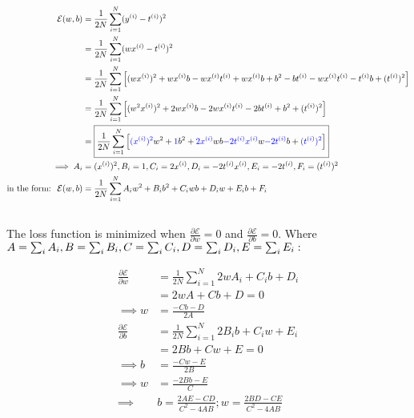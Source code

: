 \documentclass{article}
\begin{document}
\subsection{}

\begin{align*}
\mathcal{E} (w, b) &= \frac{1}{2N} \sum_{i = 1}^{N} (y^{(i)} - t^{(i)})^2 \\
&=  \frac{1}{2N} \sum_{i = 1}^{N} (wx^{(i)} - t^{(i)})^2 \\
&= \frac{1}{2N}  \sum_{i = 1}^{N}  \left[ (wx^{(i)})^2 + wx^{(i)}b -wx^{(i)} t^{(i)} + wx^{(i)}b + b^2 - bt^{(i)} - wx^{(i)}t^{(i)} - t^{(i)}b + (t^{(i)})^2 \right] \\
&= \frac{1}{2N}  \sum_{i = 1}^{N}  \left[ (w^2 x^{(i)})^2 + 2wx^{(i)} b - 2w x^{(i)} t^{(i)} - 2bt^{(i)} + b^2 + (t^{(i)})^2 \right] \\
&= \boxed{ \frac{1}{2N}  \sum_{i = 1}^{N} \left[ \textcolor{blue}{(x^{(i)})^2} w^2 + \textcolor{blue}{1}b^2 + \textcolor{blue}{2x^{(i)}}wb  \textcolor{blue}{-2t^{(i)}x^{(i)}}w \textcolor{blue}{ -2t^{(i)}}b + \textcolor{blue}{(t^{(i)})^2}	\right] }\\
\implies A_i &= (x^{(i)})^2, B_i = 1, C_i = 2x^{(i)}, D_i = -2t^{(i)}x^{(i)}, E_i = -2t^{(i)}, F_i = (t^{(i)})^2 \\
\text{in the form: } \; \mathcal{E} (w, b) &= \frac{1}{2N} \sum_{i = 1}^{N} A_i w^2 + B_i b^2 + C_i wb + D_i w + E_i b + F_i
\end{align*}

\subsection{}
\noindent The loss function is minimized when $\frac{\partial \mathcal{E}}{\partial w} = 0$ and $\frac{\partial \mathcal{E}}{\partial b} = 0$. Where $A = \sum_i A_i, \\ B =\sum_i B_i,  C =\sum_i C_i, D =\sum_i D_i, E =\sum_i E_i:$ 

\begin{align}
\frac{\partial \mathcal{E}}{\partial w} &=  \frac{1}{2N} \sum_{i = 1}^{N} 2wA_i + C_i b + D_i \\
&= 2wA + Cb + D = 0 \\
\implies w &= \frac{-Cb - D}{2A} \\
\frac{\partial{\mathcal{E}}}{\partial b} &=  \frac{1}{2N} \sum_{i = 1}^{N} 2 B_i b + C_i w + E_i \\
&= 2Bb + Cw + E = 0 \\
\implies b &= \frac{-Cw -E}{2B} \\
\implies w &= \frac{-2Bb - E}{C} \\
\implies & \boxed{b = \frac{2AE - CD}{C^2 - 4AB} ; w = \frac{2BD - CE}{C^2 - 4AB}} 
\end{align}
\end{document}

